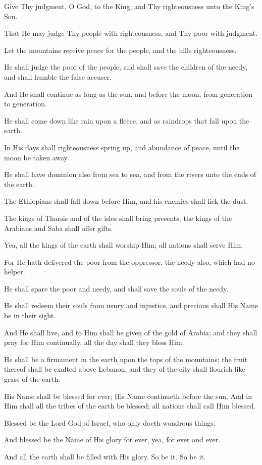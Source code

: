 Give Thy judgment, O God, to the King, and Thy righteousness unto the King's Son.

That He may judge Thy people with righteousness, and Thy poor with judgment.

Let the mountains receive peace for the people, and the hills righteousness.

He shall judge the poor of the people, and shall save the children of the needy, and shall humble the false accuser.

And He shall continue as long as the sun, and before the moon, from generation to generation.

He shall come down like rain upon a fleece, and as raindrops that fall upon the earth.

In His days shall righteousness spring up, and abundance of peace, until the moon be taken away.

He shall have dominion also from sea to sea, and from the rivers unto the ends of the earth.

The Ethiopians shall fall down before Him, and his enemies shall lick the dust.

The kings of Tharsis and of the isles shall bring presents; the kings of the Arabians and Saba shall offer gifts.

Yea, all the kings of the earth shall worship Him; all nations shall serve Him.

For He hath delivered the poor from the oppressor, the needy also, which had no helper.

He shall spare the poor and needy, and shall save the souls of the needy.

He shall redeem their souls from usury and injustice, and precious shall His Name be in their sight.

And He shall live, and to Him shall be given of the gold of Arabia; and they shall pray for Him continually, all the day shall they bless Him.

He shall be a firmament in the earth upon the tops of the mountains; the fruit thereof shall be exalted above Lebanon, and they of the city shall flourish like grass of the earth.

His Name shall be blessed for ever; His Name continueth before the sun. And in Him shall all the tribes of the earth be blessed; all nations shall call Him blessed.

Blessed be the Lord God of Israel, who only doeth wondrous things.

And blessed be the Name of His glory for ever, yea, for ever and ever.

And all the earth shall be filled with His glory. So be it. So be it.
